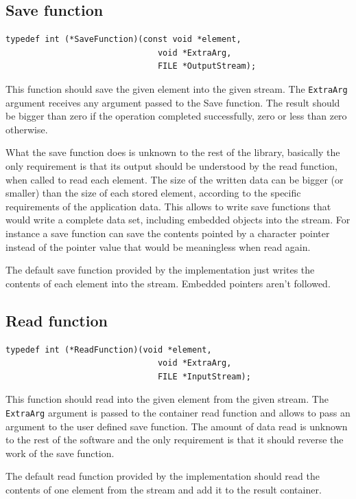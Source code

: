 \documentclass[12pt,a4paper]{memoir} %
\begin{document}
\subsection{Save function}
\begin{verbatim}
typedef int (*SaveFunction)(const void *element, 
                               void *ExtraArg, 
                               FILE *OutputStream);
\end{verbatim}
This function should save the given element into the given stream.  The \verb,ExtraArg, argument receives any argument passed to the Save function.
The result should be bigger than zero if the operation completed successfully, zero or less than zero otherwise.

What the save function does is unknown to the rest of the library, basically the only requirement is that its output should be understood by the
read function, when called to read each element. The size of the written data can be bigger (or smaller) than the size of each stored element,
according to the specific requirements of the application data. This allows to write save functions that would write a complete data set, including
embedded objects into the stream. For instance a save function can save the contents pointed by a character pointer instead of the pointer value 
that would be meaningless when read again.

The default save function provided by the implementation just writes the contents of each element into the stream. Embedded pointers aren't followed.
\subsection{Read function}
\begin{verbatim}
typedef int (*ReadFunction)(void *element, 
                               void *ExtraArg, 
                               FILE *InputStream);
\end{verbatim}
This function should read into the given element from the given stream. The \verb,ExtraArg, argument is passed to the container read function and allows to pass an argument to the user defined save function. The amount of data read is unknown to the rest of the software and the only requirement
is that it should reverse the work of the save function.

The default read function provided by the implementation should read the contents of one element from the stream and add it to the result container.
\end{document}
